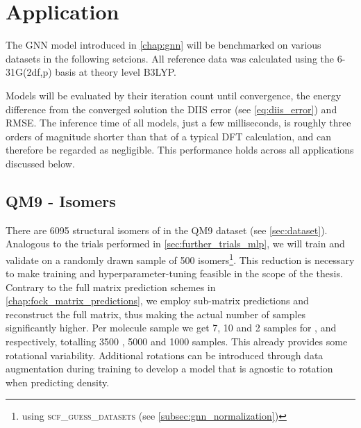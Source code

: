 \chapter{Application}
\label{chap:application}
The GNN model introduced in \autoref{chap:gnn} will be benchmarked on various datasets in the following setcions. All reference data was calculated using the 6-31G(2df,p) basis at theory level B3LYP. 

Models will be evaluated by their iteration count until convergence, the energy difference from the converged solution the DIIS error (see \autoref{eq:diis_error}) and RMSE. The inference time of all models, just a few milliseconds, is roughly three orders of magnitude shorter than that of a typical DFT calculation, and can therefore be regarded as negligible. This performance holds across all applications discussed below.

\section{QM9 -  Isomers}
\label{sec:qm9_isomers_benchmark}
There are 6095 structural isomers of  in the QM9 dataset (see \autoref{sec:dataset}). Analogous to the trials performed in \autoref{sec:further_trials_mlp}, we will train and validate on a randomly drawn sample of 500 isomers\footnote{using \textsc{scf\_guess\_datasets} (see \autoref{subsec:gnn_normalization})}. This reduction is necessary to make training and hyperparameter-tuning feasible in the scope of the thesis. Contrary to the full matrix prediction schemes in \autoref{chap:fock_matrix_predictions}, we employ sub-matrix predictions and reconstruct the full matrix, thus making the actual number of samples significantly higher. Per molecule sample we get 7, 10 and 2 samples for ,  and  respectively, totalling 3500 , 5000  and 1000  samples. This already provides some rotational variability. Additional rotations can be introduced through data augmentation during training to develop a model that is agnostic to rotation when predicting density.
\newpage
